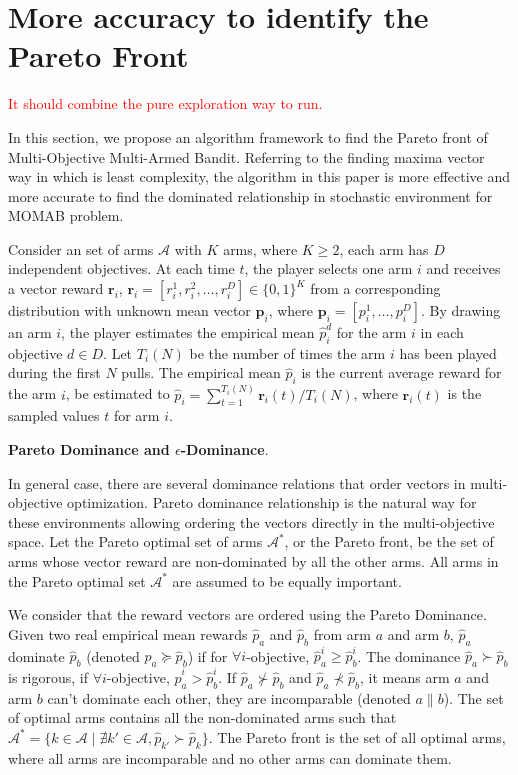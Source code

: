 \section{More accuracy to identify the Pareto Front}
\label{sec:identify}
\textcolor{red}{It should combine the pure exploration way to run.}

In this section, we propose an algorithm framework to find the Pareto front  of Multi-Objective Multi-Armed Bandit. Referring to the finding maxima vector way in \cite{kung1975finding} which is least complexity, the algorithm in this paper is more effective and more accurate to find the dominated relationship in stochastic environment for MOMAB problem. 

Consider an set of arms $\mathscr{A}$ with $K$ arms, where $K\geqslant 2$, 
each arm has $D$ independent objectives. At each time $t$, the player 
selects one arm $i$ and receives a vector reward $\mathbf{r}_i$, 
$\mathbf{r}_i = [r_i^1,r_i^2, \dots, r_i^D] \in \{0,1\}^K$ from a 
corresponding distribution with unknown mean vector $\mathbf{p}_i$, where $\mathbf{p}_i = [p_i^1,\dots,p_i^D]$. By drawing an arm $i$, the player estimates the empirical mean $\hat{p}_i^d$ for the arm $i$ in each objective $d\in D$. Let $T_i(N)$ be the number of times the arm $i$ has been played during the first $N$ pulls. The empirical mean $\hat{p}_i$ is the current average reward for the arm $i$, be estimated to $\hat{p}_i = \sum_{t=1}^{T_i(N)} \mathbf{r}_i(t)/T_i(N)$, where $\mathbf{r}_i(t)$ is the sampled values $t$ for arm $i$.  

\textbf{Pareto Dominance and $\epsilon$-Dominance}.

In general case, there are several dominance relations that order vectors in multi-objective optimization. Pareto dominance relationship is the natural way for these environments allowing ordering the vectors directly in the multi-objective space. Let the Pareto optimal set of arms $\mathscr{A}^{\ast}$, or the Pareto front, be the set of arms whose vector reward are non-dominated by all the other arms. All arms in the Pareto optimal set $\mathscr{A}^{\ast}$ are assumed to be equally important.

We consider that the reward vectors are ordered using the Pareto Dominance. Given two real empirical mean rewards $\hat{p}_a$ and $\hat{p}_b$ from arm $a$ and arm $b$, $\hat{p}_a$ dominate $\hat{p}_b$ (denoted $\hat{p}_a \succeq \hat{p}_b$) if for $\forall i$-objective, $\hat{p}_a^i \geqslant \hat{p}_b^i$. The dominance $\hat{p}_a \succ \hat{p}_b$ is rigorous, if $\forall i$-objective, $\hat{p}_a^i > \hat{p}_b^i$. If $\hat{p}_a \nsucc \hat{p}_b$ and $\hat{p}_a \nprec \hat{p}_b$, it means arm $a$ and arm $b$ can't dominate each other, they are incomparable (denoted $a \parallel b$). The set of optimal arms contains all the non-dominated arms such that $\mathscr{A}^{\ast} = \{ k\in \mathscr{A} \mid \nexists k'\in \mathscr{A} , \hat{p}_{k'}\succ \hat{p}_k\}$. The Pareto front is the set of all optimal arms, where all arms are incomparable and no other arms can dominate them. 

